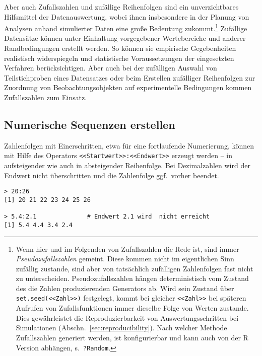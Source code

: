 Aber auch Zufallszahlen und zufällige Reihenfolgen sind ein unverzichtbares Hilfsmittel der Datenauswertung, wobei ihnen insbesondere in der Planung von Analysen anhand simulierter Daten eine große Bedeutung zukommt.\footnote{\label{ftn:random_num}Wenn hier und im Folgenden von Zufallszahlen die Rede ist, sind immer \emph{Pseudozufallszahlen} gemeint. Diese kommen nicht im eigentlichen Sinn zufällig zustande, sind aber von tatsächlich zufälligen Zahlenfolgen fast nicht zu unterscheiden. Pseudozufallszahlen hängen deterministisch vom Zustand des die Zahlen produzierenden Generators ab. Wird sein Zustand über \lstinline!set.seed(<<Zahl>>)! festgelegt, kommt bei gleicher \lstinline!<<Zahl>>! bei späteren Aufrufen von Zufallsfunktionen immer dieselbe Folge von Werten zustande. Dies gewährleistet die Reproduzierbarkeit von Auswertungsschritten bei Simulationen (Abschn.\ \ref{sec:reproducibility}). Nach welcher Methode Zufallszahlen generiert werden, ist konfigurierbar und kann auch von der R Version abhängen, s.\ \lstinline!?Random!.} Zufällige Datensätze können unter Einhaltung vorgegebener Wertebereiche und anderer Randbedingungen erstellt werden. So können sie empirische Gegebenheiten realistisch widerspiegeln und statistische Voraussetzungen der eingesetzten Verfahren berücksichtigen. Aber auch bei der zufälligen Auswahl von Teilstichproben eines Datensatzes oder beim Erstellen zufälliger Reihenfolgen zur Zuordnung von Beobachtungsobjekten auf experimentelle Bedingungen kommen Zufallszahlen zum Einsatz.

\subsection{Numerische Sequenzen erstellen}
\label{sec:seq}

Zahlenfolgen mit Einerschritten, etwa für eine fortlaufende Numerierung, können mit Hilfe des Operators \lstinline!<<Startwert>>:<<Endwert>>! erzeugt werden -- in aufsteigender wie auch in absteigender Reihenfolge. Bei Dezimalzahlen wird der Endwert nicht überschritten und die Zahlenfolge ggf.\ vorher beendet.
\begin{lstlisting}
> 20:26
[1] 20 21 22 23 24 25 26

> 5.4:2.1              # Endwert 2.1 wird  nicht erreicht
[1] 5.4 4.4 3.4 2.4
\end{lstlisting}

